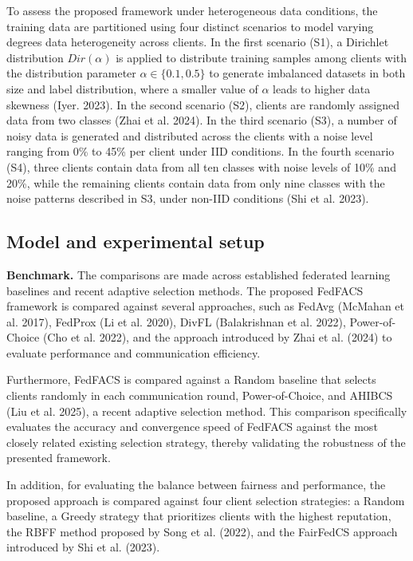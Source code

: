 \documentclass[pdflatex,sn-mathphys-num,oneside]{sn-jnl}%
\theoremstyle{thmstyleone}%
\theoremstyle{thmstyletwo}%
\theoremstyle{thmstylethree}%
\begin{document}
To assess the proposed framework under heterogeneous data conditions, the training data are partitioned using four distinct scenarios to model varying degrees data heterogeneity across clients. In the first scenario (S1), a Dirichlet distribution $\mathrm{\textit{Dir}}(\alpha)$ is applied to distribute training samples among clients with the distribution parameter $\alpha \in \{0.1, 0.5\}$ to generate imbalanced datasets in both size and label distribution, where a smaller value of $\alpha$ leads to higher data skewness (Iyer. 2023). In the second scenario (S2), clients are randomly assigned data from two classes (Zhai et al. 2024). In the third scenario (S3), a number of noisy data is generated and distributed across the clients with a noise level ranging from 0\% to 45\% per client under IID conditions. In the fourth scenario (S4), three clients contain data from all ten classes with noise levels of 10\% and 20\%, while the remaining clients contain data from only nine classes with the noise patterns described in S3, under non-IID conditions (Shi et al. 2023).

\subsection{Model and experimental setup}

\textbf{Benchmark.} The comparisons are made across established federated learning baselines and recent adaptive selection methods. The proposed FedFACS framework is compared against several approaches, such as FedAvg (McMahan et al. 2017), FedProx (Li et al. 2020), DivFL (Balakrishnan et al. 2022), Power-of-Choice (Cho et al. 2022), and the approach introduced by Zhai et al. (2024) to evaluate performance and communication efficiency. 

Furthermore, FedFACS is compared against a Random baseline that selects clients randomly in each communication round, Power-of-Choice, and AHIBCS (Liu et al. 2025), a recent adaptive selection method. This comparison specifically evaluates the accuracy and convergence speed of FedFACS against the most closely related existing selection strategy, thereby validating the robustness of the presented framework.

In addition, for evaluating the balance between fairness and performance, the proposed approach is compared against four client selection strategies: a Random baseline, a Greedy strategy that prioritizes clients with the highest reputation, the RBFF method proposed by Song et al. (2022), and the FairFedCS approach introduced by Shi et al. (2023).
\end{document}
